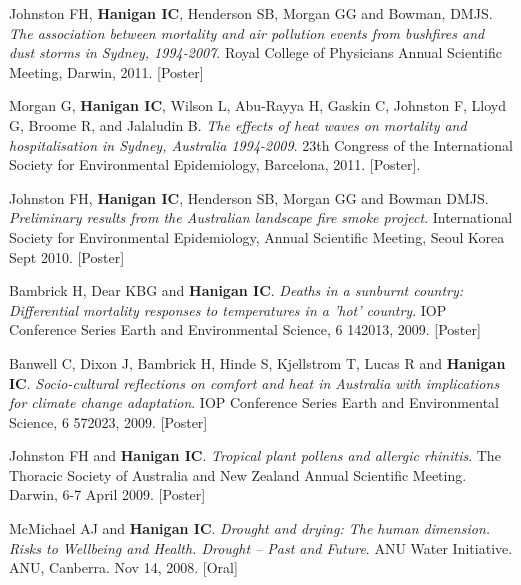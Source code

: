 \documentclass[a4paper,11pt]{article}
\begin{document}
\medskip
{}
\medskip
\renewcommand{\labelenumi}{\textsc{f}\theenumi.}
\begin{revnumerate}

\item Johnston FH, \textbf{Hanigan IC}, Henderson SB, Morgan GG and Bowman, DMJS. \emph{The association between mortality and air pollution events from bushfires and dust storms in Sydney, 1994-2007}. Royal College of Physicians Annual Scientific Meeting, Darwin,  2011. [Poster]

\item Morgan G, \textbf{Hanigan IC}, Wilson L, Abu-Rayya H, Gaskin C, Johnston F, Lloyd G, Broome R, and Jalaludin B. \emph{The effects of heat waves on mortality and hospitalisation in Sydney, Australia 1994-2009}. 23th Congress of the International Society for Environmental Epidemiology, Barcelona, 2011. [Poster].

\item Johnston FH, \textbf{Hanigan IC}, Henderson SB, Morgan GG and Bowman DMJS. \emph{Preliminary results from the Australian landscape fire smoke project}. International Society for Environmental Epidemiology, Annual Scientific Meeting, Seoul Korea Sept 2010. [Poster]

\item Bambrick H, Dear KBG and \textbf{Hanigan IC}.  \emph{Deaths in a sunburnt country: Differential mortality responses to temperatures in a 'hot' country}. IOP Conference Series Earth and Environmental Science, 6 142013, 2009. [Poster]

\item Banwell C, Dixon J, Bambrick H, Hinde S, Kjellstrom T, Lucas R and \textbf{Hanigan IC}. \emph{Socio-cultural reflections on comfort and heat in Australia with implications for climate change adaptation}. IOP Conference Series Earth and Environmental Science, 6 572023, 2009. [Poster]

\item Johnston FH and \textbf{Hanigan IC}.  \emph{Tropical plant pollens and allergic rhinitis}.  The Thoracic Society of Australia and New Zealand Annual Scientific Meeting.  Darwin, 6-7 April 2009. [Poster]

\item McMichael AJ and \textbf{Hanigan IC}. \emph{Drought and drying: The human dimension. Risks to Wellbeing and Health. Drought – Past and Future}. ANU Water Initiative. ANU, Canberra. Nov 14, 2008. [Oral]


\end{revnumerate}
\end{document}
